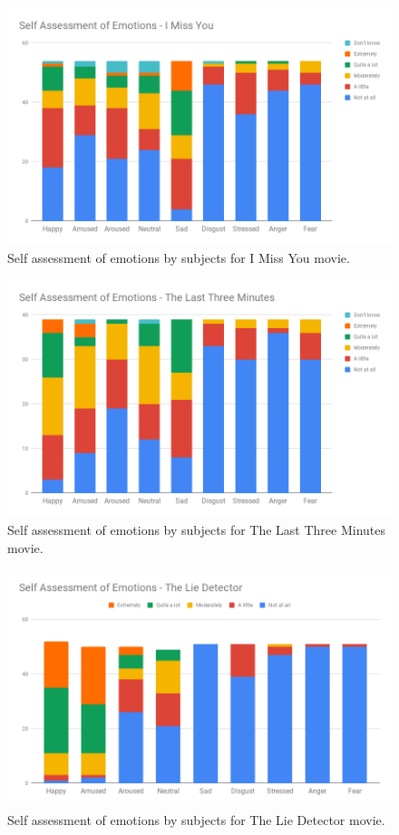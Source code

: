 \newpage
\label{assessment}
\begin{figure}
\centering
\includegraphics[width=140mm]{Figures/i_miss_you.png}
\caption{Self assessment of emotions by subjects for I Miss You movie.}
\label{fig:i_miss_you}
\end{figure}

\begin{figure}
\centering
\includegraphics[width=140mm]{Figures/the_last_three_minutes.png}
\caption{Self assessment of emotions by subjects for The Last Three Minutes movie.}
\label{fig:the_last_three_minutes}
\end{figure}

\begin{figure}
\centering
\includegraphics[width=140mm]{Figures/the_lie_detector.png}
\caption{Self assessment of emotions by subjects for The Lie Detector movie.}
\label{fig:the_lie_detector}
\end{figure}

